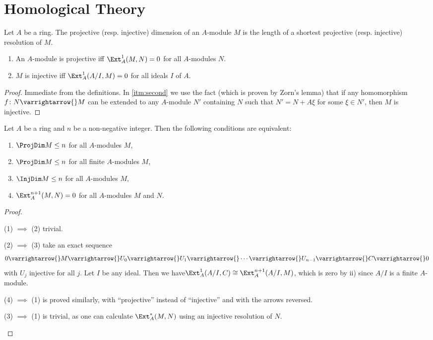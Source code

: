 \documentclass[../main]{subfiles}
\begin{document}
\section{Homological Theory}\label{sec:18}

\newparagraph Let $A$ be a ring. The projective (resp. injective) dimension of an $A$-module $M$ is the length of a shortest projective (resp. injective) resolution of $M$. 

\begin{lemma}\leavevmode\label{lem:18.01}
\begin{enumerate}[label=(\roman*)]
    \item An $A$-module is projective iff $\Ext_A^1(M,N)=0$ for all $A$-modules $N$. 
    \item $M$ is injective iff $\Ext_A^1(A/I,M)=0$ for all ideals $I$ of $A$.\label{itm:second} 
\end{enumerate}
\end{lemma}
\begin{proof}
Immediate from the definitions. In \ref{itm:second} we use the fact (which is proven by Zorn's lemma) that if any homomorphism $f\colon N \varrightarrow{} M$ can be extended to any $A$-module $N'$ containing $N$ such that $N'=N+A\xi$ for some $\xi \in N'$, then $M$ is injective.
\end{proof}
\begin{lemma}\label{lem:18.02}
Let $A$ be a ring and $n$ be a non-negative integer. Then the following conditions are equivalent$\colon$
\begin{enumerate}[label=(\arabic*)]
    \item \label{lem:18.02.1}$\ProjDim M \leq n$ for all $A$-modules $M$,
    \item \label{lem:18.02.2}$\ProjDim M \leq n$ for all finite $A$-modules $M$,
    \item \label{lem:18.02.3}$\InjDim M \leq n$ for all $A$-modules $M$,
    \item \label{lem:18.02.4}$\Ext_A^{n+1}(M,N)=0$ for all $A$-modules $M$ and $N$.
\end{enumerate}
\end{lemma}
\begin{proof}\phantom{,}
\begin{implyenumerate}
    \item[(1) $\implies$ (2)] trivial.
    \item[(2) $\implies$ (3)] take an exact sequence \[0 \varrightarrow{} M \varrightarrow{} U_0 \varrightarrow{} U_1 \varrightarrow{} \cdots \varrightarrow{} U_{n-1}\varrightarrow{} C \varrightarrow{} 0\] with $U_j$ injective for all $j$. Let $I$ be any ideal. Then we have\newline $\Ext_A^1 (A/I,C) \cong \Ext_A^{n+1}(A/I,M)$, which is zero by ii) since $A/I$ is a finite $A$-module.
    \item[(4) $\implies$ (1)] is proved similarly, with ``projective'' instead of ``injective'' and with the arrows reversed.
    \item[(3) $\implies$ (1)] is trivial, as one can calculate $\Ext_A^*(M,N)$ using an injective resolution of $N$. 
\end{implyenumerate}
\end{proof}
\end{document}
